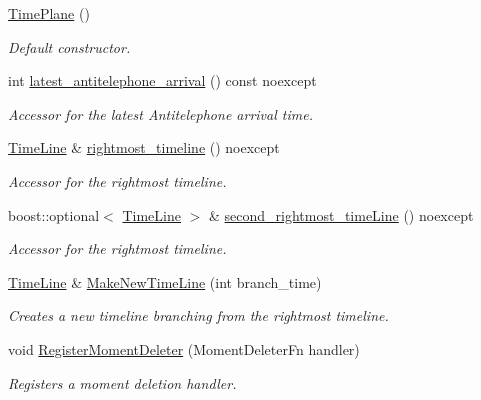 \begin{DoxyCompactItemize}
\item 
\hyperlink{classtimeplane_1_1_time_plane_a8d8f1227ade6490fa8b814f1b7f18ecc}{Time\+Plane} ()
\begin{DoxyCompactList}\small\item\em Default constructor. \end{DoxyCompactList}\item 
int \hyperlink{classtimeplane_1_1_time_plane_ae66d15a7ce9adb5f63906011a455400b}{latest\+\_\+antitelephone\+\_\+arrival} () const noexcept
\begin{DoxyCompactList}\small\item\em Accessor for the latest Antitelephone arrival time. \end{DoxyCompactList}\item 
\hyperlink{classtimeplane_1_1_time_line}{Time\+Line} \& \hyperlink{classtimeplane_1_1_time_plane_a317c9e247011cf5f4e6e36f2f7651932}{rightmost\+\_\+timeline} () noexcept
\begin{DoxyCompactList}\small\item\em Accessor for the rightmost timeline. \end{DoxyCompactList}\item 
boost\+::optional$<$ \hyperlink{classtimeplane_1_1_time_line}{Time\+Line} $>$ \& \hyperlink{classtimeplane_1_1_time_plane_a32da05c87dfe4bc33ec5cb87fd97297f}{second\+\_\+rightmost\+\_\+time\+Line} () noexcept
\begin{DoxyCompactList}\small\item\em Accessor for the rightmost timeline. \end{DoxyCompactList}\item 
\hyperlink{classtimeplane_1_1_time_line}{Time\+Line} \& \hyperlink{classtimeplane_1_1_time_plane_ab8c82092c1c5c3f18c8677f8ce38662c}{Make\+New\+Time\+Line} (int branch\+\_\+time)
\begin{DoxyCompactList}\small\item\em Creates a new timeline branching from the rightmost timeline. \end{DoxyCompactList}\item 
void \hyperlink{classtimeplane_1_1_time_plane_a22be7b27d461dcb849f48c149a044502}{Register\+Moment\+Deleter} (Moment\+Deleter\+Fn handler)
\begin{DoxyCompactList}\small\item\em Registers a moment deletion handler. \end{DoxyCompactList}\end{DoxyCompactItemize}
